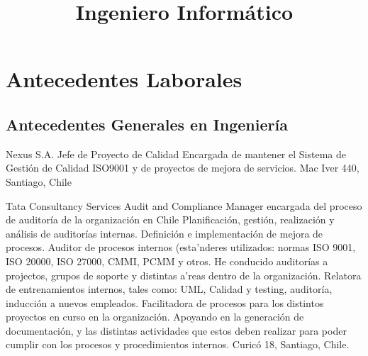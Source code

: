 \documentclass[11pt,letterpaper,roman]{moderncv}
\title{\normalfont \small Ingeniero Informático}
\begin{document}
\maketitle

	
	
\section{Antecedentes Laborales}


\subsection{Antecedentes Generales en Ingeniería}
	{Nexus S.A.} %
	{Jefe de Proyecto de Calidad} %
	{Encargada de mantener el Sistema de Gestión de Calidad ISO9001 y de proyectos de mejora de servicios.
	}{}
	{Mac Iver 440, Santiago, Chile}

	{Tata Consultancy Services} %
	{Audit and Compliance Manager} %
	{encargada del proceso de auditoría de la organización en Chile}
	{Planificación, gestión, realización y análisis de auditorías internas. Definición e implementación de mejora de procesos. 
	Auditor de procesos internos (esta'nderes utilizados: normas ISO 9001, ISO 20000, ISO 27000, CMMI, PCMM y otros.
	He conducido auditorías a projectos, grupos de soporte y distintas a'reas dentro de la organización. 
	Relatora de entrenamientos internos, tales como: UML, Calidad y testing, auditoría, inducción a nuevos empleados.
	Facilitadora de procesos para los distintos proyectos en curso en la organización.
	Apoyando en la generación de documentación, y las distintas actividades que estos deben realizar para poder cumplir con los procesos y procedimientos internos.
	}
	{Curicó 18, Santiago, Chile.}
	
\end{document}
